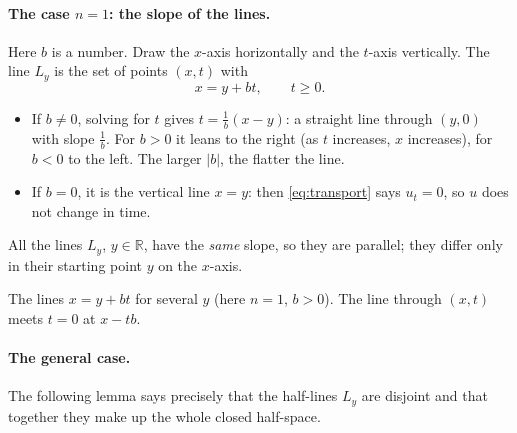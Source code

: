 \documentclass[11pt]{article}
\theoremstyle{plain}
\theoremstyle{definition}
\theoremstyle{remark}
\begin{document}
\paragraph{The case $n = 1$: the slope of the lines.} Here $b$ is a number. Draw the $x$-axis horizontally and the $t$-axis vertically. The line $L_y$ is the set of points $(x,t)$ with
$$ x = y + bt, \qquad t \ge 0. $$
\begin{itemize}
    \item If $b \neq 0$, solving for $t$ gives $t = \frac{1}{b}(x - y)$: a straight line through $(y,0)$ with slope $\frac1b$. For $b > 0$ it leans to the right (as $t$ increases, $x$ increases), for $b < 0$ to the left. The larger $|b|$, the flatter the line.
    \item If $b = 0$, it is the vertical line $x = y$: then \eqref{eq:transport} says $u_t = 0$, so $u$ does not change in time.
\end{itemize}
All the lines $L_y$, $y \in \mathbb{R}$, have the \emph{same} slope, so they are parallel; they differ only in their starting point $y$ on the $x$-axis.

\begin{center}

\small The lines $x = y + bt$ for several $y$ (here $n = 1$, $b > 0$). The line through $(x,t)$ meets $t = 0$ at $x - tb$.
\end{center}

\paragraph{The general case.} The following lemma says precisely that the half-lines $L_y$ are disjoint and that together they make up the whole closed half-space.
\end{document}
